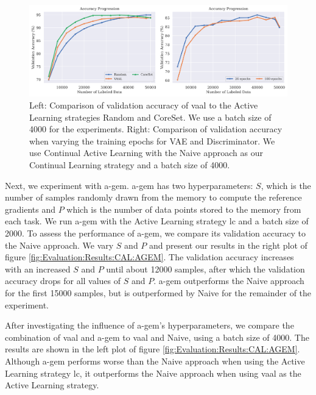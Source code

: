 \begin{figure}[h]
    \centering
    \includegraphics[width=\linewidth]{images/results_CAL/VAAL_plots.png}
    \caption[Continual Active Learning Custom Replay strategy]{Left: Comparison of validation accuracy of \gls{vaal} to the Active Learning strategies Random and CoreSet. We use a batch size of 4000 for the experiments. Right: Comparison of validation accuracy when varying the training 
    epochs for VAE and Discriminator. We use Continual Active Learning with the Naive approach as our Continual Learning strategy and a batch size of 4000.}
    \label{fig:Evaluation:Results:CAL:VAAL}
\end{figure}

Next, we experiment with \gls{a-gem}. \gls{a-gem} has two hyperparameters: $S$, which is the number of samples randomly drawn from the memory to compute the reference gradients and $P$ which is the number of data points stored to the memory from each task. We run \gls{a-gem} with the Active Learning
strategy \gls{lc} and a batch size of 2000. To assess the performance of \gls{a-gem}, we compare its validation accuracy to the Naive approach. We vary $S$ and $P$ and present our results in the right plot of figure \ref{fig:Evaluation:Results:CAL:AGEM}. The validation accuracy increases with
an increased $S$ and $P$ until about 12000 samples, after which the validation accuracy drops for all values of $S$ and $P$. \gls{a-gem} outperforms the Naive approach for the first 15000 samples, but is outperformed by Naive for the remainder of the experiment. \par
After investigating the influence of \gls{a-gem}'s hyperparameters, we compare the combination of \gls{vaal} and \gls{a-gem} to \gls{vaal} and Naive, using a batch size of 4000. The results are shown in the left plot of figure \ref{fig:Evaluation:Results:CAL:AGEM}. Although \gls{a-gem} performs worse than the Naive
approach when using the Active Learning strategy \gls{lc}, it outperforms the Naive approach when using \gls{vaal} as the Active Learning strategy. \par


